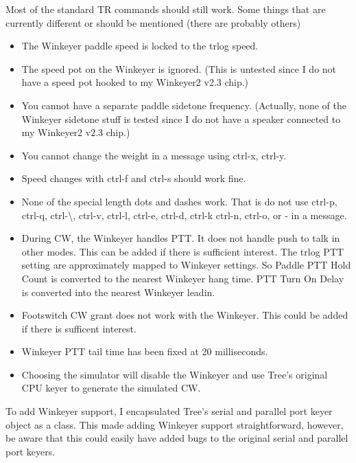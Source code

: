 \documentclass[12pt]{article}
\begin{document}
Most of the standard TR commands should still work. Some things that
are currently different or should be mentioned (there are probably others)
\begin{itemize}
\item
The Winkeyer paddle speed is locked to the trlog speed.
\item
The speed pot on the Winkeyer is ignored. (This is untested since I
do not have a speed pot hooked to my Winkeyer2 v2.3 chip.)
\item
You cannot have a separate paddle sidetone frequency. (Actually, none
of the Winkeyer sidetone stuff is tested since I do not have a speaker
connected to my Winkeyer2 v2.3 chip.)
\item
You cannot change the weight in a message using ctrl-x, ctrl-y.
\item
Speed changes with ctrl-f and ctrl-s should work fine.
\item
None of the special length dots and dashes work. That is do not
use ctrl-p, ctrl-q, ctrl-\textbackslash, ctrl-v, ctrl-l, ctrl-e, ctrl-d, ctrl-k
ctrl-n, ctrl-o, or - in a message.
\item
During CW, the Winkeyer handles PTT. It does not handle push to talk
in other modes. This can be added if there is sufficient interest.
The trlog PTT setting are approximately mapped to Winkeyer settings.
So Paddle PTT Hold Count is converted to the nearest Winkeyer hang time.
PTT Turn On Delay is converted into the nearest Winkeyer leadin.
\item
Footswitch CW grant does not work with the Winkeyer. This could be
added if there is sufficent interest.
\item
Winkeyer PTT tail time has been fixed at 20 milliseconds.
\item
Choosing the simulator will disable the Winkeyer and use Tree's original
CPU keyer to generate the simulated CW.
\end{itemize}

To add Winkeyer support, I encapsulated Tree's serial and parallel
port keyer object as a class.  This made adding Winkeyer support
straightforward, however, be aware that this could easily have added
bugs to the original serial and parallel port keyers.
\end{document}

